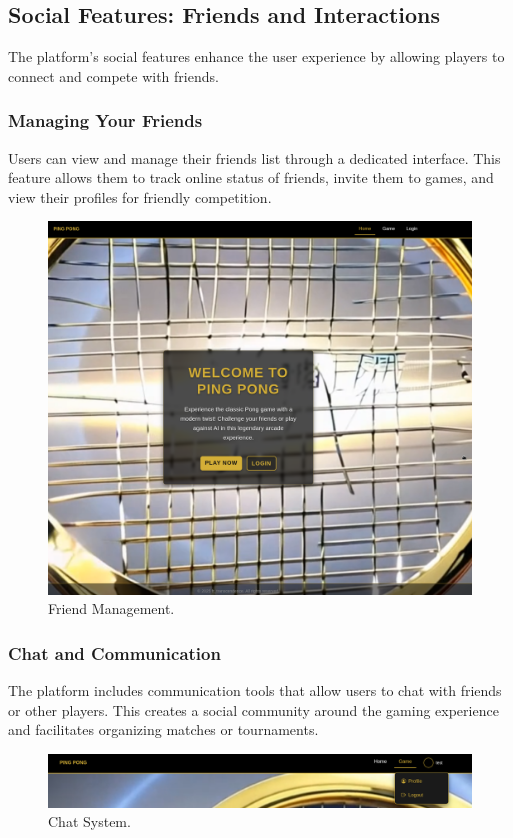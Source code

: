 \subsection{Social Features: Friends and Interactions}

The platform's social features enhance the user experience by allowing players to connect and compete with friends.

\subsubsection{Managing Your Friends} Users can view and manage their friends list through a dedicated interface. This feature allows them to track online status of friends, invite them to games, and view their profiles for friendly competition.

\begin{figure}[H]
    \centering
    \includegraphics[width=0.65\linewidth]{Figures/images/new_images/HomePage.png} %
    \caption{Friend Management.} %
    \label{fig:friend-list-journey}
\end{figure}

\subsubsection{Chat and Communication} The platform includes communication tools that allow users to chat with friends or other players. This creates a social community around the gaming experience and facilitates organizing matches or tournaments.

\begin{figure}[H]
    \centering
    \includegraphics[width=0.65\linewidth]{Figures/images/new_images/MenuBar.png} %
    \caption{Chat System.} %
    \label{fig:chat-interface-journey}
\end{figure}


